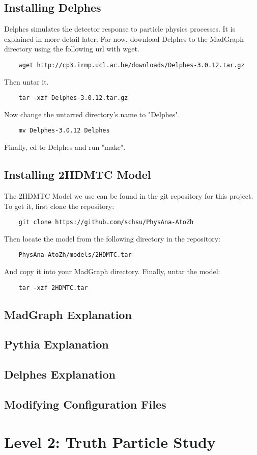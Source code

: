 \documentclass{article}
\begin{document}
\subsection {Installing Delphes}

Delphes simulates the detector response to particle physics processes. It is explained in more detail later. For now, download Delphes to the MadGraph directory using the following url with wget.

\begin{verbatim}
	wget http://cp3.irmp.ucl.ac.be/downloads/Delphes-3.0.12.tar.gz
\end{verbatim}

Then untar it.

\begin{verbatim}
	tar -xzf Delphes-3.0.12.tar.gz
\end{verbatim}

Now change the untarred directory's name to "Delphes".

\begin{verbatim}
	mv Delphes-3.0.12 Delphes
\end{verbatim}

Finally, cd to Delphes and run "make".

\subsection {Installing 2HDMTC Model}

The 2HDMTC Model we use can be found in the git repository for this project. To get it, first clone the repository:

\begin{verbatim}
	git clone https://github.com/schsu/PhysAna-AtoZh
\end{verbatim}

Then locate the model from the following directory in the repository:

\begin{verbatim}
	PhysAna-AtoZh/models/2HDMTC.tar
\end{verbatim}

And copy it into your MadGraph directory. Finally, untar the model:

\begin{verbatim}
	tar -xzf 2HDMTC.tar
\end{verbatim}

\subsection {MadGraph Explanation}

\subsection {Pythia Explanation}

\subsection {Delphes Explanation}

\subsection {Modifying Configuration Files}

\section{Level 2: Truth Particle Study}
\end{document}
